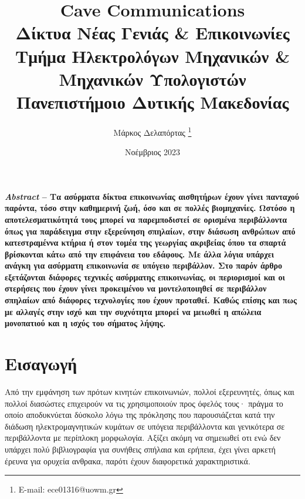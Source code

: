 \documentclass[12pt]{article}
\title{ \textsf{ Cave Communications}\\
    \textsf{Δίκτυα Νέας Γενιάς \& Επικοινωνίες}\\
    \textsf{\Large Τμήμα Ηλεκτρολόγων Μηχανικών \& Μηχανικών Υπολογιστών}\\
    \textsf{\large Πανεπιστήμοιο Δυτικής Μακεδονίας}
} \author{\textsf{Μάρκος Δελαπόρτας} \footnote{E-mail: ece01316@uowm.gr}}
\date{\textsf{Νοέμβριος 2023}}
\begin{document}
\maketitle

\begin{multicols*}{2}
    \scriptsize \textbf{ \textit{Abstract} -- Τα ασύρματα δίκτυα επικοινωνίας αισθητήρων
        έχουν γίνει πανταχού παρόντα, τόσο στην καθημερινή ζωή, όσο και σε πολλές
        βιομηχανίες. Ωστόσο η αποτελεσματικότητά τους μπορεί να παρεμποδιστεί σε ορισμένα
        περιβάλλοντα όπως για παράδειγμα στην εξερεύνηση σπηλαίων, στην διάσωση ανθρώπων
        από κατεστραμέννα κτήρια ή στον τομέα της γεωργίας ακριβείας όπου τα σπαρτά
        βρίσκονται κάτω από την επιφάνεια του εδάφους. Με άλλα λόγια υπάρχει ανάγκη για
        ασύρματη επικοινωνία σε υπόγειο περιβάλλον. Στο παρόν άρθρο εξετάζονται διάφορες
        τεχνικές ασύρματης επικοινωνίας, οι περιορισμοί και οι στερήσεις που έχουν γίνει
        προκειμένου να μοντελοποιηθεί σε περιβάλλον σπηλαίων από διάφορες τεχνολογίες που
        έχουν προταθεί. Καθώς επίσης και πως με αλλαγές στην ισχύ και την συχνότητα μπορεί
        να μειωθεί η απώλεια μονοπατιού και η ισχύς του σήματος λήψης. }

    \section{\normalsize \textsf{Εισαγωγή}}
        Από την εμφάνηση των πρότων κινητών επικοινωνιών, πολλοί εξερευνητές, όπως και
        πολλοί διασώστες επιχειρούν να τις χρησιμοποιούν προς όφελός τους· πράγμα το οποίο
        αποδυκνύεται δύσκολο λόγω της πρόκλησης που παρουσιάζεται κατά την διάδωση
        ηλεκτρομαγνητικών κυμάτων σε υπόγεια περιβάλλοντα και γενικότερα σε περιβάλλοντα
        με περίπλοκη μορφωλογία. Αξίζει ακόμη να σημειωθεί οτι ενώ δεν υπάρχει πολύ
        βιβλιογραφία για συνήθεις σπήλαια και ερήπεια, έχει γίνει αρκετή έρευνα για
        ορυχεία ανθρακα, παρότι έχουν διαφορετικά χαρακτηριστικά.
    

\end{multicols*}
\end{document}
